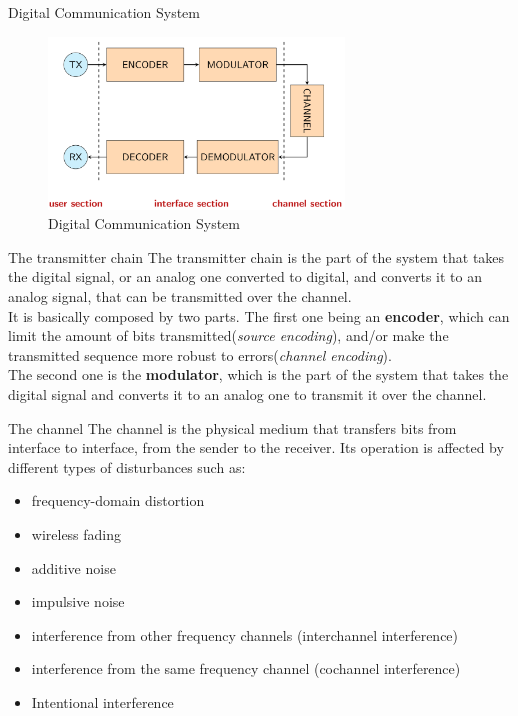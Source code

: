 \begin{section}{Digital Communication System}
\begin{figure}[h]
  \centering
  \includegraphics[width=0.7\textwidth]{img/digital communication schema.png}
  \caption{Digital Communication System}
  \label{fig:Digital Communication System}
\end{figure}
\begin{subsection}{The transmitter chain}
The transmitter chain is the part of the system that takes the digital signal, or an analog one 
converted to digital, and converts it to an analog signal, that can be transmitted over the
channel.\\
It is basically composed by two parts. The first one being an \textbf{encoder}, which can limit the amount 
of bits transmitted(\textit{source encoding}), and/or make the transmitted sequence more robust to
errors(\textit{channel encoding}).\\
The second one is the \textbf{modulator}, which is the part of the system that takes the digital
signal and converts it to an analog one to transmit it over the channel.
\end{subsection}
\begin{subsection}{The channel}
The channel is the physical medium that transfers bits from interface to interface, from the sender
to the receiver.
Its operation is affected by different types of disturbances such as:
\begin{itemize}
	\item frequency-domain distortion
	\item wireless fading
	\item additive noise
	\item impulsive noise
	\item interference from other frequency channels (interchannel interference)
	\item interference from the same frequency channel (cochannel interference)
	\item Intentional interference
\end {itemize}

\end{subsection}
\end{section}
